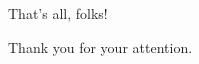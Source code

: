 
\begin{frame}{That's all, folks!}
  \begin{block}{}
    Thank you for your attention. 
  \end{block}
\end{frame}

